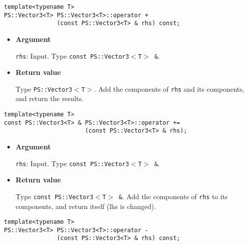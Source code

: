 \mbox{}

\begin{screen}
\begin{verbatim}
template<typename T>
PS::Vector3<T> PS::Vector3<T>::operator + 
               (const PS::Vector3<T> & rhs) const;
\end{verbatim}
\end{screen}

\begin{itemize}

\item{{\bf Argument}}

\texttt{rhs}: Input. Type \texttt{const PS::Vector3$<$T$>$ \&}.

\item{{\bf Return value}}

Type \texttt{PS::Vector3$<$T$>$}. Add the components of \texttt{rhs} and its
components, and return the results.

\end{itemize}


\begin{screen}
\begin{verbatim}
template<typename T>
const PS::Vector3<T> & PS::Vector3<T>::operator += 
                       (const PS::Vector3<T> & rhs);
\end{verbatim}
\end{screen}

\begin{itemize}

\item{{\bf Argument}}

\texttt{rhs}: Input. Type \texttt{const PS::Vector3$<$T$>$ \&}.

\item{{\bf Return value}}

Type \texttt{const PS::Vector3$<$T$>$ \&}. Add the components of \texttt{rhs} to its
components, and return itself (lhs is changed).

\end{itemize}


\begin{screen}
\begin{verbatim}
template<typename T>
PS::Vector3<T> PS::Vector3<T>::operator - 
               (const PS::Vector3<T> & rhs) const;
\end{verbatim}
\end{screen}


